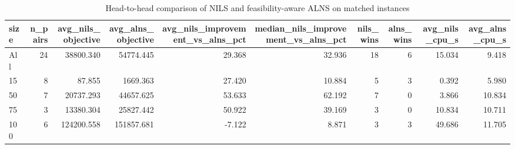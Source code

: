 \begin{table}
\caption{Head-to-head comparison of NILS and feasibility-aware ALNS on matched instances}
\label{tab:alns_head_to_head}
\begin{tabular}{lrrrrrrrrr}
\toprule
size & n_pairs & avg_nils_objective & avg_alns_objective & avg_nils_improvement_vs_alns_pct & median_nils_improvement_vs_alns_pct & nils_wins & alns_wins & avg_nils_cpu_s & avg_alns_cpu_s \\
\midrule
All & 24 & 38800.340 & 54774.445 & 29.368 & 32.936 & 18 & 6 & 15.034 & 9.418 \\
15 & 8 & 87.855 & 1669.363 & 27.420 & 10.884 & 5 & 3 & 0.392 & 5.980 \\
50 & 7 & 20737.293 & 44657.625 & 53.633 & 62.192 & 7 & 0 & 3.866 & 10.834 \\
75 & 3 & 13380.304 & 25827.442 & 50.922 & 39.169 & 3 & 0 & 10.834 & 10.711 \\
100 & 6 & 124200.558 & 151857.681 & -7.122 & 8.871 & 3 & 3 & 49.686 & 11.705 \\
\bottomrule
\end{tabular}
\end{table}

